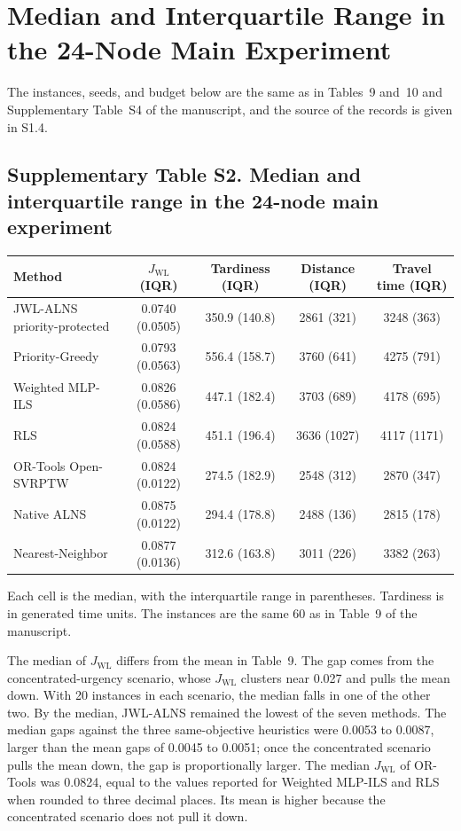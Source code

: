 \documentclass[11pt,a4paper]{article}
\begin{document}
\section{Median and Interquartile Range in the 24-Node Main Experiment}

The instances, seeds, and budget below are the same as in Tables~9 and~10 and Supplementary Table~S4 of the manuscript, and the source of the records is given in S1.4.

\subsection*{Supplementary Table S2. Median and interquartile range in the 24-node main experiment}

\begin{center}
\small
\begin{tabular}{lcccc}
\toprule
Method & $J_{\mathrm{WL}}$ (IQR) & Tardiness (IQR) & Distance (IQR) & Travel time (IQR) \\
\midrule
JWL-ALNS priority-protected & 0.0740 (0.0505) & 350.9 (140.8) & 2861 (321) & 3248 (363) \\
Priority-Greedy & 0.0793 (0.0563) & 556.4 (158.7) & 3760 (641) & 4275 (791) \\
Weighted MLP-ILS & 0.0826 (0.0586) & 447.1 (182.4) & 3703 (689) & 4178 (695) \\
RLS & 0.0824 (0.0588) & 451.1 (196.4) & 3636 (1027) & 4117 (1171) \\
OR-Tools Open-SVRPTW & 0.0824 (0.0122) & 274.5 (182.9) & 2548 (312) & 2870 (347) \\
Native ALNS & 0.0875 (0.0122) & 294.4 (178.8) & 2488 (136) & 2815 (178) \\
Nearest-Neighbor & 0.0877 (0.0136) & 312.6 (163.8) & 3011 (226) & 3382 (263) \\
\bottomrule
\end{tabular}
\end{center}

Each cell is the median, with the interquartile range in parentheses. Tardiness is in generated time units. The instances are the same 60 as in Table~9 of the manuscript.

The median of $J_{\mathrm{WL}}$ differs from the mean in Table~9. The gap comes from the concentrated-urgency scenario, whose $J_{\mathrm{WL}}$ clusters near 0.027 and pulls the mean down. With 20 instances in each scenario, the median falls in one of the other two. By the median, JWL-ALNS remained the lowest of the seven methods. The median gaps against the three same-objective heuristics were 0.0053 to 0.0087, larger than the mean gaps of 0.0045 to 0.0051; once the concentrated scenario pulls the mean down, the gap is proportionally larger. The median $J_{\mathrm{WL}}$ of OR-Tools was 0.0824, equal to the values reported for Weighted MLP-ILS and RLS when rounded to three decimal places. Its mean is higher because the concentrated scenario does not pull it down.
\end{document}
